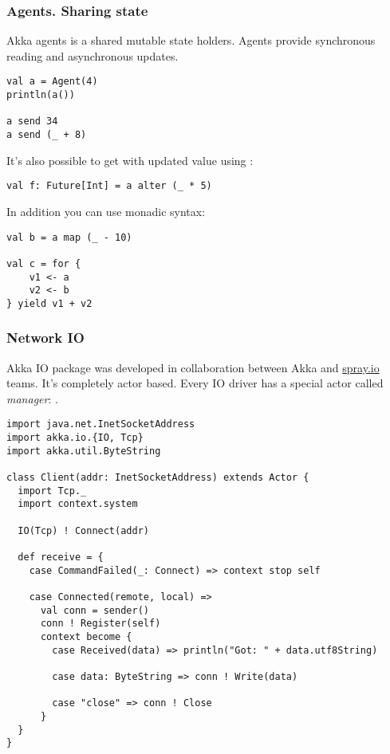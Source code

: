 \begin{frame}[fragile]
\frametitle{Agents. Sharing state}
Akka agents is a shared mutable state holders.  Agents provide synchronous reading and asynchronous updates.
\begin{lstlisting}[name=agents]
val a = Agent(4)
println(a())

a send 34
a send (_ + 8)
\end{lstlisting}
It's also possible to get  with updated value using :
\begin{lstlisting}[name=agents]
val f: Future[Int] = a alter (_ * 5)
\end{lstlisting}
In addition you can use monadic syntax:
\begin{lstlisting}[name=agents]
val b = a map (_ - 10)

val c = for {
    v1 <- a
    v2 <- b
} yield v1 + v2
\end{lstlisting}
\end{frame}

\begin{frame}[fragile]
\frametitle{Network IO}
Akka IO package was developed in collaboration between Akka and \href{http://spray.io}{spray.io} teams. 
It's completely actor based. Every IO driver has a special actor called \emph{manager}:
.

\begin{example}
\begin{lstlisting}
import java.net.InetSocketAddress
import akka.io.{IO, Tcp}
import akka.util.ByteString

class Client(addr: InetSocketAddress) extends Actor {
  import Tcp._
  import context.system

  IO(Tcp) ! Connect(addr)

  def receive = {
    case CommandFailed(_: Connect) => context stop self

    case Connected(remote, local) =>
      val conn = sender()
      conn ! Register(self)
      context become {
        case Received(data) => println("Got: " + data.utf8String)

        case data: ByteString => conn ! Write(data)

        case "close" => conn ! Close
      }
  }
}
\end{lstlisting}
\end{example}
\end{frame}

